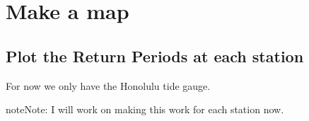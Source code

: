 \documentclass[letterpaper,10pt,english]{jupyterBook}
\begin{document}
\part{Make a map}
\label{\detokenize{notebooks/regional_and_local/SL_Extremes_annual:make-a-map}}

\chapter{Plot the Return Periods at each station}
\label{\detokenize{notebooks/regional_and_local/SL_Extremes_annual:plot-the-return-periods-at-each-station}}
\sphinxAtStartPar
For now we only have the Honolulu tide gauge.

\begin{sphinxadmonition}{note}{Note:}
\sphinxAtStartPar
I will work on making this work for each station now.
\end{sphinxadmonition}
\end{document}
